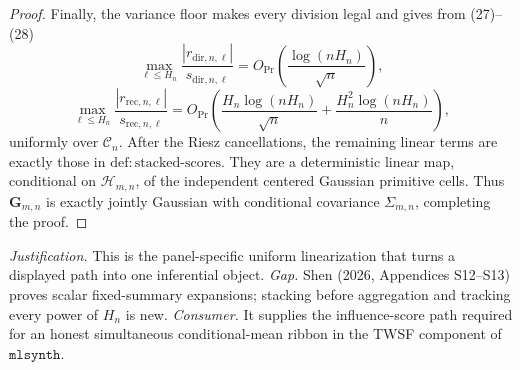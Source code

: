 \documentclass{article}
\begin{document}
\begin{proof}
Finally, the variance floor makes every division legal and gives from (27)--(28)
\[
 \max_{\ell\le H_n}\frac{|r_{\mathrm{dir},n,\ell}|}{s_{\mathrm{dir},n,\ell}}
 =O_{\Pr}\!\left(\frac{\log(nH_n)}{\sqrt n}\right),
\]
\[
 \max_{\ell\le H_n}\frac{|r_{\mathrm{rec},n,\ell}|}{s_{\mathrm{rec},n,\ell}}
 =O_{\Pr}\!\left(\frac{H_n\log(nH_n)}{\sqrt n}
 +\frac{H_n^2\log(nH_n)}n\right),
\]
uniformly over \(\mathcal C_n\).  After the Riesz cancellations, the remaining linear terms are exactly those in \(\mathrm{def{:}stacked\mbox{-}scores}\).  They are a deterministic linear map, conditional on \(\mathcal H_{m,n}\), of the independent centered Gaussian primitive cells.  Thus \(\boldsymbol G_{m,n}\) is exactly jointly Gaussian with conditional covariance \(\Sigma_{m,n}\), completing the proof.
\end{proof}
\par\smallskip\noindent \textit{Justification.} This is the panel-specific uniform linearization that turns a displayed path into one inferential object. \textit{Gap.} Shen (2026, Appendices S12--S13) proves scalar fixed-summary expansions; stacking before aggregation and tracking every power of \(H_n\) is new. \textit{Consumer.} It supplies the influence-score path required for an honest simultaneous conditional-mean ribbon in the TWSF component of \(\texttt{mlsynth}\).
\end{document}
